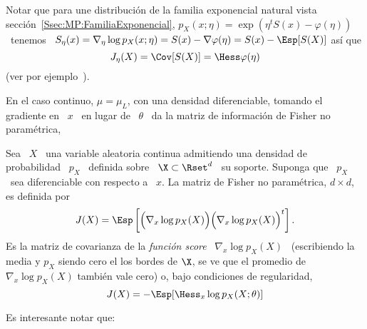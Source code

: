 Notar  que para  une  distribuci\'on  de la  familia  exponencial natural  vista
secci\'on~\ref{Ssec:MP:FamiliaExponencial},  $p_X(x;\eta)  =  \exp\left(  \eta^t
  S(x)  - \varphi(\eta)  \right)$  \  tenemos \  $S_\eta(x)  = \nabla_\eta  \log
p_X(x;\eta) = S(x) - \nabla \varphi(\eta) = S(x) - \Esp[S(X)]$ as\'i que
%
\[
J_\eta(X) = \Cov[S(X)] = \Hess \varphi(\eta)
\]
%
(ver por ejemplo~\cite{LehCas98, Bos07}).

En el caso  continuo, $\mu = \mu_L$, con una  densidad diferenciable, tomando el
gradiente en \ $x$  \ en lugar de \ $\theta$ \ da  la matriz de informaci\'on de
Fisher no param\'etrica,
%
\begin{definicion}
\label{Def:SZ:MatrizFisherNoParametrica}
%
  Sea  \  $X$ \  una  variable aleatoria  continua  admitiendo  una densidad  de
  probabilidad \ $p_X$  \ definida sobre \ $\X \subset  \Rset^d$ \ su soporte.
  Suponga que  \ $p_X$ \ sea  diferenciable con respecto  a \ $x$.  La  matriz de
  Fisher no param\'etrica, $d \times d$, es definida por
  \[
  J(X) =  \Esp\left[ \Big(  \nabla_x \log p_X(X)  \Big) \Big(  \nabla_x \log
      p_X(X) \Big)^t \right].
  \]
  Es  la matriz  de covarianza  de  la {\it  funci\'on score}  \ $\nabla_x  \log
  p_X(X)$ \ (escribiendo la media y $p_X$  siendo cero el los bordes de $\X$, se
  ve que  el promedio  de $\nabla_x  \log p_X(X)$ tambi\'en  vale cero)  o, bajo
  condiciones de regularidad,
  \[
  J(X) = - \Esp[\Hess_x \log p_X(X;\theta)]
  \]
\end{definicion}
%
Es interesante notar que:
%
